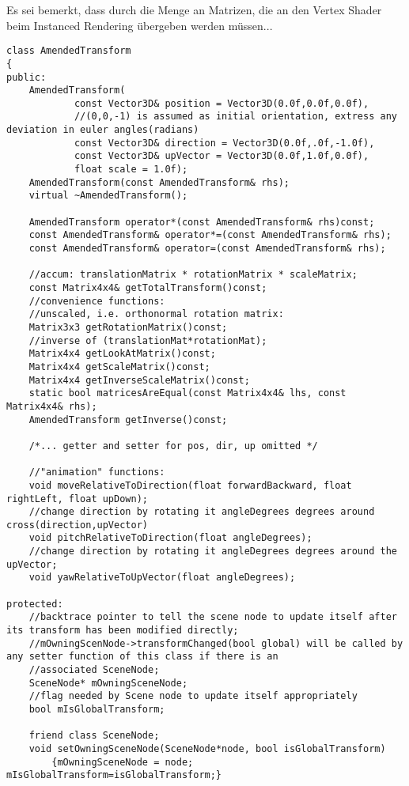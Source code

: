 	Es sei bemerkt, dass durch die Menge an Matrizen, die an den Vertex Shader beim Instanced Rendering übergeben
	werden müssen... 
 	
 	\begin{lstlisting}[caption={AmenededTransform Klassendefinition, gekürzt},label=listing:AmendedTransformDef]
class AmendedTransform
{
public:
	AmendedTransform(
			const Vector3D& position = Vector3D(0.0f,0.0f,0.0f),
			//(0,0,-1) is assumed as initial orientation, extress any deviation in euler angles(radians)
			const Vector3D& direction = Vector3D(0.0f,.0f,-1.0f),
			const Vector3D& upVector = Vector3D(0.0f,1.0f,0.0f),
			float scale = 1.0f);
	AmendedTransform(const AmendedTransform& rhs);
	virtual ~AmendedTransform();

	AmendedTransform operator*(const AmendedTransform& rhs)const;
	const AmendedTransform& operator*=(const AmendedTransform& rhs);
	const AmendedTransform& operator=(const AmendedTransform& rhs);

	//accum: translationMatrix * rotationMatrix * scaleMatrix;
	const Matrix4x4& getTotalTransform()const;
	//convenience functions:
	//unscaled, i.e. orthonormal rotation matrix:
	Matrix3x3 getRotationMatrix()const;
	//inverse of (translationMat*rotationMat);
	Matrix4x4 getLookAtMatrix()const;
	Matrix4x4 getScaleMatrix()const;
	Matrix4x4 getInverseScaleMatrix()const;
	static bool matricesAreEqual(const Matrix4x4& lhs, const Matrix4x4& rhs);
	AmendedTransform getInverse()const;

	/*... getter and setter for pos, dir, up omitted */ 

	//"animation" functions:
	void moveRelativeToDirection(float forwardBackward, float rightLeft, float upDown);
	//change direction by rotating it angleDegrees degrees around cross(direction,upVector)
	void pitchRelativeToDirection(float angleDegrees);
	//change direction by rotating it angleDegrees degrees around the upVector;
	void yawRelativeToUpVector(float angleDegrees);

protected:
	//backtrace pointer to tell the scene node to update itself after its transform has been modified directly;
	//mOwningScenNode->transformChanged(bool global) will be called by any setter function of this class if there is an
	//associated SceneNode;
	SceneNode* mOwningSceneNode;
	//flag needed by Scene node to update itself appropriately
	bool mIsGlobalTransform;
	
	friend class SceneNode;
	void setOwningSceneNode(SceneNode*node, bool isGlobalTransform)
		{mOwningSceneNode = node; mIsGlobalTransform=isGlobalTransform;}



\end{lstlisting}
